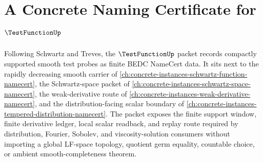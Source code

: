\chapter{A Concrete Naming Certificate for $\TestFunctionUp$}
\label{ch:concrete-instances-test-function-namecert}

Following Schwartz and Treves, the $\TestFunctionUp$ packet records compactly supported smooth test probes as finite BEDC NameCert data. It sits next to the rapidly decreasing smooth carrier of \autoref{ch:concrete-instances-schwartz-function-namecert}, the Schwartz-space packet of \autoref{ch:concrete-instances-schwartz-space-namecert}, the weak-derivative route of \autoref{ch:concrete-instances-weak-derivative-namecert}, and the distribution-facing scalar boundary of \autoref{ch:concrete-instances-tempered-distribution-namecert}. The packet exposes the finite support window, finite derivative ledger, local scalar readback, and replay route required by distribution, Fourier, Sobolev, and viscosity-solution consumers without importing a global LF-space topology, quotient germ equality, countable choice, or ambient smooth-completeness theorem.

